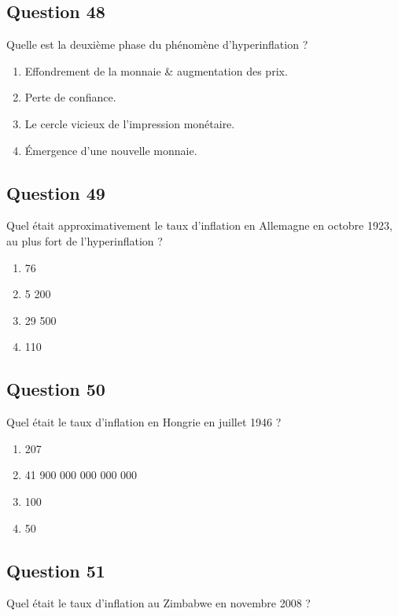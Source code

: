 \documentclass[12pt,a4paper]{article}
\begin{document}
\bigskip


\subsection*{Question 48}
Quelle est la deuxième phase du phénomène d'hyperinflation ?

\begin{enumerate}[label=\Alph*., leftmargin=*]
\item Effondrement de la monnaie & augmentation des prix.
\item Perte de confiance.
\item Le cercle vicieux de l'impression monétaire.
\item Émergence d'une nouvelle monnaie.
\end{enumerate}

\bigskip


\subsection*{Question 49}
Quel était approximativement le taux d'inflation en Allemagne en octobre 1923, au plus fort de l'hyperinflation ?

\begin{enumerate}[label=\Alph*., leftmargin=*]
\item 76 %
\item 5 200 %
\item 29 500 %
\item 110 %
\end{enumerate}

\bigskip


\subsection*{Question 50}
Quel était le taux d'inflation en Hongrie en juillet 1946 ?

\begin{enumerate}[label=\Alph*., leftmargin=*]
\item 207 %
\item 41 900 000 000 000 000 %
\item 100 %
\item 50 %
\end{enumerate}

\bigskip


\subsection*{Question 51}
Quel était le taux d'inflation au Zimbabwe en novembre 2008 ?
\end{document}
